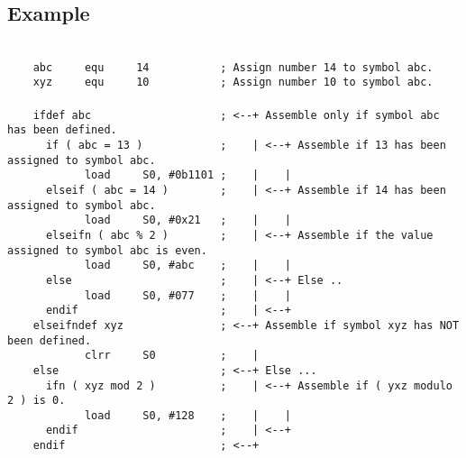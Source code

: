     \subsection{Example}
        ~\\
        {
            \mysmallfont
            \verb'    abc     equ     14           ; Assign number 14 to symbol abc.'\\
            \verb'    xyz     equ     10           ; Assign number 10 to symbol abc.'\\
            \verb''\\
            \verb'    ifdef abc                    ; <--+ Assemble only if symbol abc has been defined.'\\
            \verb'      if ( abc = 13 )            ;    | <--+ Assemble if 13 has been assigned to symbol abc.'\\
            \verb'            load     S0, #0b1101 ;    |    |'\\
            \verb'      elseif ( abc = 14 )        ;    | <--+ Assemble if 14 has been assigned to symbol abc.'\\
            \verb'            load     S0, #0x21   ;    |    |'\\
            \verb'      elseifn ( abc % 2 )        ;    | <--+ Assemble if the value assigned to symbol abc is even.'\\
            \verb'            load     S0, #abc    ;    |    |'\\
            \verb'      else                       ;    | <--+ Else ..'\\
            \verb'            load     S0, #077    ;    |    |'\\
            \verb'      endif                      ;    | <--+'\\
            \verb'    elseifndef xyz               ; <--+ Assemble if symbol xyz has NOT been defined.'\\
            \verb'            clrr     S0          ;    |'\\
            \verb'    else                         ; <--+ Else ...'\\
            \verb'      ifn ( xyz mod 2 )          ;    | <--+ Assemble if ( yxz modulo 2 ) is 0.'\\
            \verb'            load     S0, #128    ;    |    |'\\
            \verb'      endif                      ;    | <--+'\\
            \verb'    endif                        ; <--+'
        }
